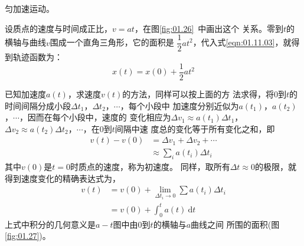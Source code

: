   \vspace{-1em}\example 匀加速运动。

  设质点的速度与时间成正比，$v=at$，在图\ref{fig:01.26}~中画出这个
关系。零到$t$的横轴与曲线$v$围成一个直角三角形，它的面积是
$\dfrac{1}{2} a t^2$，代入式\eqref{eqn:01.11.03}，就得到轨迹函数为：
\begin{equation*}\label{eqn:01.11.04i}
    x\left(t\right)=x\left(0\right)+\frac{1}{2}at^2 \tag{1.11.4$'$}
\end{equation*}

    已知加速度$a\left(t\right)$，求速度$v\left(t\right)$的方法，同样可以按上面的方
法求得，将0到$t$的时间间隔分成小段$\Delta t_1$，$\Delta t_2$，$\cdots$，每个小段中
加速度分别近似为$a\left(t_1\right)$，$a\left(t_2\right)$，$\cdots$，因而在每个小段中，速度的
变化相应为$\Delta v_1\approx a\left(t_1\right)\Delta t_1$，$\Delta v_2\approx a\left(t_2\right)\Delta t_2$，$\cdots$，在0到$t$间隔中速
度总的变化等于所有变化之和，即
\begin{equation}\label{eqn:01.11.05}
    \begin{aligned}
        v\left(t\right)-v\left(0\right) &=\Delta v_{1}+\Delta v_{2}+\cdots \\
        & \approx \sum_{i} a\left(t_{i}\right) \Delta t_{i}
    \end{aligned}
\end{equation}
其中$v\left(0\right)$是$t=0$时质点的速度，称为初速度。
同样，取所有$\Delta t\approx 0$的极限，就得到速度变化的精确表达式为，
\begin{equation}\label{eqn:01.11.06}
    \begin{aligned}
        v\left(t\right) &=v\left(0\right)+\lim _{\Delta t_{i} \rightarrow 0} \sum a\left(t_{i}\right) \Delta t_{i} \\
        &=v\left(0\right)+\int_{0}^{t} a\left(t\right) {~\mathrm d}  t
    \end{aligned}
\end{equation}
上式中积分的几何意义是$a-t$图中由0到$t$的横轴与$a$曲线之间
所围的面积(图\ref{fig:01.27})。

